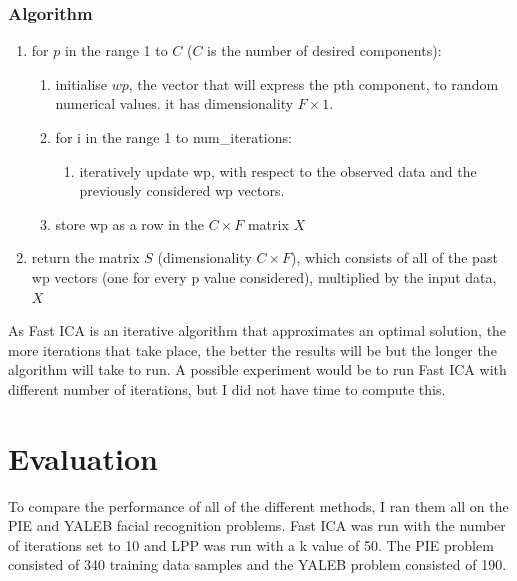 \documentclass[12pt]{article} %
\begin{document}
\subsubsection{Algorithm}
\begin{enumerate}
\item for \(p\) in the range 1 to \(C\) (\(C\) is the number of desired components):

\begin{enumerate}
\item initialise \(wp\), the vector that will express the pth component, to random numerical values. it has dimensionality \(F \times 1\).
\item for i in the range 1 to num\_iterations:

\begin{enumerate}
\item iteratively update wp, with respect to the observed data and the previously considered wp vectors.
\end{enumerate}

\item store wp as a row in the \(C \times F\) matrix \(X\)

\end{enumerate}

\item return the matrix \(S\) (dimensionality \(C \times F\)), which consists of all of the past wp vectors (one for every p value considered), multiplied by the input data, \(X\)

\end{enumerate}

As Fast ICA is an iterative algorithm that approximates an optimal solution, the more iterations that take place, the better the results will be but the longer the algorithm will take to run. A possible experiment would be to run Fast ICA with different number of iterations, but I did not have time to compute this.




\section{Evaluation}
To compare the performance of all of the different methods, I ran them all on the PIE and YALEB facial recognition problems. Fast ICA was run with the number of iterations set to 10 and LPP was run with a k value of 50. The PIE problem consisted of 340 training data samples and the YALEB problem consisted of 190.
\end{document}
